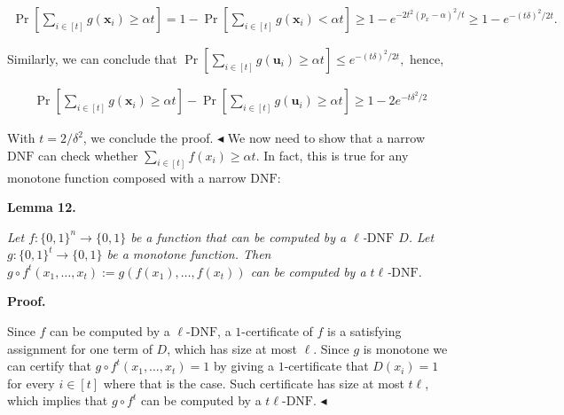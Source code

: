 \[\begin{gathered}
\Pr\left[\sum_{i\in[t]}g(\bm{x}_{i})\geq\alpha t\right]=1-\Pr\left[\sum_{i\in[t]}g(\bm{x}_{i})<\alpha t\right]\geq 1-e^{-2t^{2}(p_{x}-\alpha)^{2}/t}\geq 1-e^{-(t\delta)^{2}/2t}.
\end{gathered}\]




Similarly, we can conclude that
$\Pr\left[\sum_{i\in[t]}g(\bm{u}_{i})\geq\alpha t\right]\leq e^{-(t\delta)^{2}/2t},$
hence,\par


\[\begin{gathered}
\displaystyle\Pr\left[\sum_{i\in[t]}g(\bm{x}_{i})\geq\alpha t\right]-\Pr\left[\sum_{i\in[t]}g(\bm{u}_{i})\geq\alpha t\right] \displaystyle\geq 1-2e^{-t\delta^{2}/2}
\end{gathered}\]


With $t=2/\delta^{2}$, we conclude the proof.
$\blacktriangleleft$
We now need to show that a narrow $\mathrm{DNF}$ can check whether $\sum_{i\in[t]}f(x_{i})\geq\alpha t$. In fact, this is true for any monotone function composed with a narrow $\mathrm{DNF}$:\par





\par\medskip\noindent\textbf{
\textbf{Lemma 12}\textbf{.}
}\par



\emph{Let $f\colon\{0,1\}^{n}\rightarrow\{0,1\}$ be a function that can be computed by a $\ell$-$\mathrm{DNF}$ $D$. Let $g\colon\{0,1\}^{t}\to\{0,1\}$ be a monotone function.
Then $g\circ f^{t}(x_{1},\dots,x_{t}):=g(f(x_{1}),\dots,f(x_{t}))$ can be computed by a $t\ell$-$\mathrm{DNF}$.}\par







\par\medskip\noindent\textbf{Proof.}\par




Since $f$ can be computed by a $\ell$-$\mathrm{DNF}$, a $1$-certificate of $f$ is a satisfying assignment for one term of $D$, which has size at most $\ell$.
Since $g$ is monotone we can certify that $g\circ f^{t}(x_{1},\dots,x_{t})=1$ by giving a $1$-certificate that $D(x_{i})=1$ for every $i\in[t]$ where that is the case. Such certificate has size at most $t\ell$, which implies that $g\circ f^{t}$ can be computed by a $t\ell$-$\mathrm{DNF}$.
$\blacktriangleleft$\par




